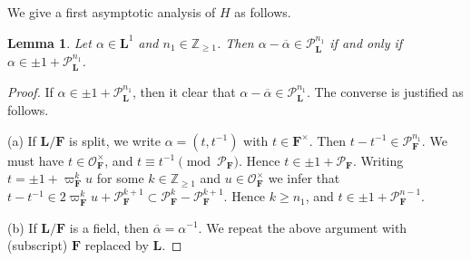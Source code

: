 \documentclass[A4]{amsart}
\def\geq{\geqslant}
\newtheorem{lemma}      [theorem]{Lemma}
\numberwithin{equation}{section} \everymath{\displaystyle}
\newcommand{\Z}{\mathbb{Z}}
\newcommand{\F}{\mathbf{F}}
\newcommand{\bL}{\mathbf{L}}
\newcommand{\vO}{\mathcal{O}}
\newcommand{\vP}{\mathcal{P}}
\begin{document}
	We give a first asymptotic analysis of $H$ as follows.

\begin{lemma} \label{lem: CongCondEquiv}
	Let $\alpha \in \bL^1$ and $n_1 \in \Z_{\geq 1}$. Then $\alpha - \overline{\alpha} \in \vP_{\bL}^{n_1}$ if and only if $\alpha \in \pm 1 + \vP_{\bL}^{n_1}$.
\end{lemma}
\begin{proof}
	If $\alpha \in \pm 1 + \vP_{\bL}^{n_1}$, then it clear that $\alpha - \overline{\alpha} \in \vP_{\bL}^{n_1}$. The converse is justified as follows.

\noindent (a) If $\bL/\F$ is split, we write $\alpha = (t,t^{-1})$ with $t \in \F^{\times}$. Then $t-t^{-1} \in \vP_{\F}^{n_1}$. We must have $t \in \vO_{\F}^{\times}$, and $t \equiv t^{-1} \pmod{\vP_{\F}}$. Hence $t \in \pm 1 + \vP_{\F}$. Writing $t = \pm 1 + \varpi_{\F}^k u$ for some $k \in \Z_{\geq 1}$ and $u \in \vO_{\F}^{\times}$ we infer that $t-t^{-1} \in 2 \varpi_{\F}^k u + \vP_{\F}^{k+1} \subset \vP_{\F}^k-\vP_{\F}^{k+1}$. Hence $k \geq n_1$, and $t \in \pm 1 + \vP_{\F}^{n-1}$.

\noindent (b) If $\bL/\F$ is a field, then $\overline{\alpha} = \alpha^{-1}$. We repeat the above argument with (subscript) $\F$ replaced by $\bL$.
\end{proof}
\end{document}

